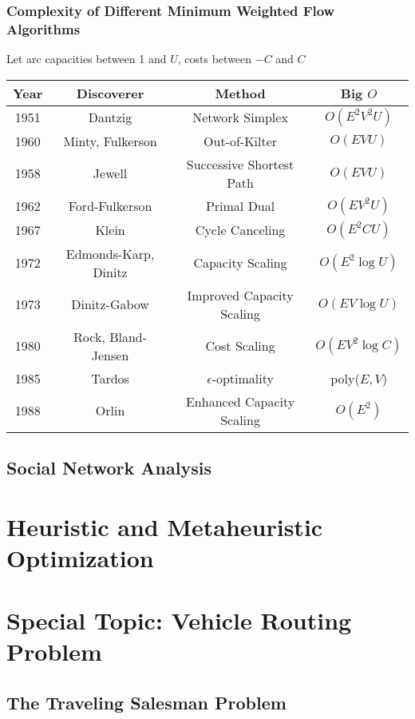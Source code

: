 			\section{Complexity of Different Minimum Weighted Flow Algorithms}
				Let arc capacities between 1 and $U$, costs between $-C$ and $C$
				\begin{table*}[ht]
					\centering
					\begin{tabular} {|c|c|c|c|}
						\hline
						Year & Discoverer & Method & Big $O$ \\
						\hline
						1951 & Dantzig & Network Simplex & $O(E^2V^2U)$ \\
						1960 & Minty, Fulkerson & Out-of-Kilter & $O(EVU)$\\
						1958 & Jewell & Successive Shortest Path & $O(EVU)$ \\
						1962 & Ford-Fulkerson & Primal Dual & $O(EV^2U)$ \\
						1967 & Klein & Cycle Canceling & $O(E^2CU)$ \\
						1972 & Edmonds-Karp, Dinitz & Capacity Scaling & $O(E^2 \log U)$\\
						1973 & Dinitz-Gabow & Improved Capacity Scaling & $O(EV\log U)$ \\
						1980 & Rock, Bland-Jensen & Cost Scaling & $O(EV^2\log C)$\\
						1985 & Tardos & $\epsilon$-optimality & poly($E,V$)\\
						1988 & Orlin & Enhanced Capacity Scaling & $O(E^2)$ \\
						\hline
					\end{tabular}
				\end{table*}

		\chapter{Social Network Analysis}

	\part{Heuristic and Metaheuristic Optimization}\label{Heur}

	\part*{Special Topic: Vehicle Routing Problem}\label{VRP}
		\chapter{The Traveling Salesman Problem}\label{chp:TSP}
